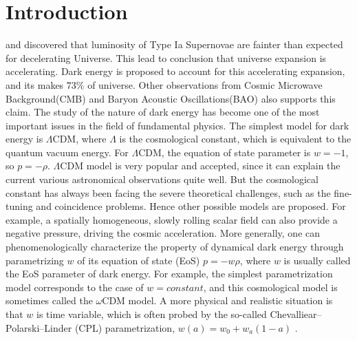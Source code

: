 \section{Introduction}
\cite{riess1998observational} and \cite{perlmutter1999measurements} discovered that luminosity of Type Ia Supernovae are fainter than expected for decelerating Universe. This lead to conclusion that universe expansion is accelerating. Dark energy is proposed to account for this accelerating expansion, and its makes $73$\% of universe. Other observations from Cosmic Microwave Background(CMB)\cite{aghanim2020planck} and Baryon Acoustic Oscillations(BAO)\cite{alam2017clustering} also supports this claim. The study of the nature of dark energy has become one of the most important issues in the field of fundamental physics. The simplest model for dark energy is $\Lambda$CDM, where $\Lambda$ is the cosmological constant, which is equivalent to the quantum vacuum energy. For $\Lambda$CDM, the equation of state parameter is $w = -1$, so $p = -\rho$. $\Lambda$CDM model is very popular and accepted, since it can explain the current various astronomical observations quite well. But the cosmological constant has always been facing the severe theoretical challenges, such as the fine-tuning and coincidence problems. Hence other possible models are proposed. For example, a spatially homogeneous, slowly rolling scalar field can also provide a negative pressure, driving the cosmic acceleration\cite{zlatev1999quintessence}. More generally, one can phenomenologically characterize the property of dynamical dark energy through parametrizing $w$ of its equation of state (EoS) $p = -w\rho$, where $w$ is usually called the EoS parameter of dark energy. For example, the simplest parametrization model corresponds to the case of $w=constant$, and this cosmological model is sometimes called the $\omega$CDM model. A more physical and realistic situation is that $w$ is time variable, which is often probed by the so-called Chevalliear–Polarski–Linder (CPL) parametrization, $w(a)=w_0+w_a(1-a)$ \cite{chevallier2001accelerating}. 